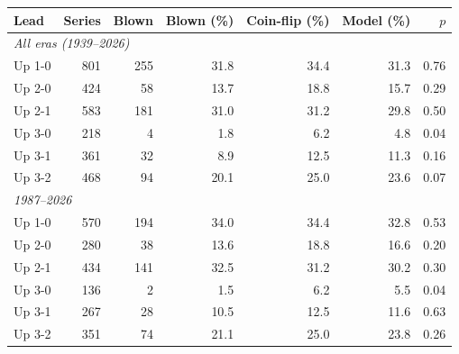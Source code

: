 \begin{tabular}{lrrrrrr}\toprule
Lead & Series & Blown & Blown (\%) & Coin-flip (\%) & Model (\%) & $p$\\\midrule
\multicolumn{7}{l}{\emph{All eras (1939--2026)}}\\
Up 1-0 & 801 & 255 & 31.8 & 34.4 & 31.3 & 0.76\\
Up 2-0 & 424 & 58 & 13.7 & 18.8 & 15.7 & 0.29\\
Up 2-1 & 583 & 181 & 31.0 & 31.2 & 29.8 & 0.50\\
Up 3-0 & 218 & 4 & 1.8 & 6.2 & 4.8 & 0.04\\
Up 3-1 & 361 & 32 & 8.9 & 12.5 & 11.3 & 0.16\\
Up 3-2 & 468 & 94 & 20.1 & 25.0 & 23.6 & 0.07\\
\multicolumn{7}{l}{\emph{1987--2026}}\\
Up 1-0 & 570 & 194 & 34.0 & 34.4 & 32.8 & 0.53\\
Up 2-0 & 280 & 38 & 13.6 & 18.8 & 16.6 & 0.20\\
Up 2-1 & 434 & 141 & 32.5 & 31.2 & 30.2 & 0.30\\
Up 3-0 & 136 & 2 & 1.5 & 6.2 & 5.5 & 0.04\\
Up 3-1 & 267 & 28 & 10.5 & 12.5 & 11.6 & 0.63\\
Up 3-2 & 351 & 74 & 21.1 & 25.0 & 23.8 & 0.26\\
\bottomrule\end{tabular}